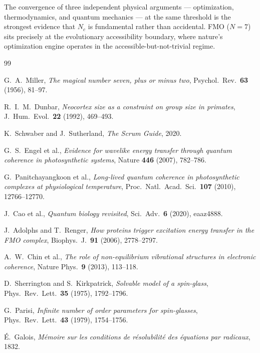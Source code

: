 \documentclass[11pt]{amsart}
\theoremstyle{definition}
\begin{document}
The convergence of three independent physical arguments --- optimization, thermodynamics, and quantum mechanics --- at the same threshold is the strongest evidence that $N_c$ is fundamental rather than accidental. FMO ($N = 7$) sits precisely at the evolutionary accessibility boundary, where nature's optimization engine operates in the accessible-but-not-trivial regime.


\begin{thebibliography}{99}

G.~A.~Miller, \emph{The magical number seven, plus or minus two}, Psychol.\ Rev.\ \textbf{63} (1956), 81--97.

R.~I.~M.~Dunbar, \emph{Neocortex size as a constraint on group size in primates}, J.\ Hum.\ Evol.\ \textbf{22} (1992), 469--493.

K.~Schwaber and J.~Sutherland, \emph{The Scrum Guide}, 2020.

G.~S.~Engel et al., \emph{Evidence for wavelike energy transfer through quantum coherence in photosynthetic systems}, Nature \textbf{446} (2007), 782--786.

G.~Panitchayangkoon et al., \emph{Long-lived quantum coherence in photosynthetic complexes at physiological temperature}, Proc.\ Natl.\ Acad.\ Sci.\ \textbf{107} (2010), 12766--12770.

J.~Cao et al., \emph{Quantum biology revisited}, Sci.\ Adv.\ \textbf{6} (2020), eaaz4888.

J.~Adolphs and T.~Renger, \emph{How proteins trigger excitation energy transfer in the FMO complex}, Biophys.\ J.\ \textbf{91} (2006), 2778--2797.

A.~W.~Chin et al., \emph{The role of non-equilibrium vibrational structures in electronic coherence}, Nature Phys.\ \textbf{9} (2013), 113--118.

D.~Sherrington and S.~Kirkpatrick, \emph{Solvable model of a spin-glass}, Phys.\ Rev.\ Lett.\ \textbf{35} (1975), 1792--1796.

G.~Parisi, \emph{Infinite number of order parameters for spin-glasses}, Phys.\ Rev.\ Lett.\ \textbf{43} (1979), 1754--1756.

\'E.~Galois, \emph{M\'emoire sur les conditions de r\'esolubilit\'e des \'equations par radicaux}, 1832.


\end{thebibliography}
\end{document}
